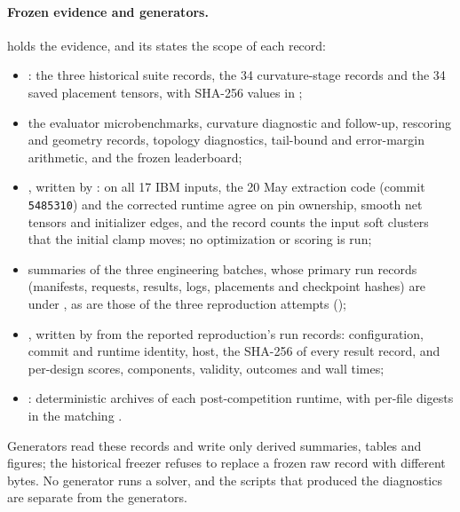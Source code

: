 \paragraph{Frozen evidence and generators.}  holds
the evidence, and its  states the scope of each record:
\begin{itemize}
  \item {}: the three historical suite records, the 34 curvature-stage
        records and the 34 saved placement tensors, with SHA-256 values in
        ;
  \item the evaluator microbenchmarks, curvature diagnostic and follow-up,
        rescoring and geometry records, topology diagnostics, tail-bound and
        error-margin arithmetic, and the frozen leaderboard;
  \item {}, written by
        : on all 17 IBM
        inputs, the 20 May extraction code (commit \texttt{5485310}) and the
        corrected runtime agree on pin ownership, smooth net tensors and initializer
        edges, and the record counts the input soft clusters that the initial clamp
        moves; no optimization or scoring is run;
  \item summaries of the three engineering batches, whose primary run records
        (manifests, requests, results, logs, placements and checkpoint hashes) are
        under , as are those of the three reproduction attempts
        ();
  \item {}, written by
         from the reported
        reproduction's run records: configuration, commit and runtime identity,
        host, the SHA-256 of every result record, and per-design scores,
        components, validity, outcomes and wall times;
  \item {}: deterministic archives of each
        post-competition runtime, with per-file digests in the matching
        .
\end{itemize}
Generators read these records and write only derived summaries, tables and figures;
the historical freezer refuses to replace a frozen raw record with different bytes.
No generator runs a solver, and the scripts that produced the diagnostics are separate
from the generators.

